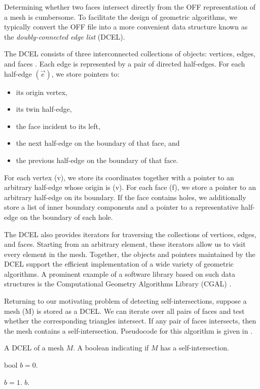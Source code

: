 Determining whether two faces intersect directly from the OFF representation of a mesh is cumbersome. To facilitate the design of geometric algorithms, we typically convert the OFF file into a more convenient data structure known as the \emph{doubly-connected edge list} (DCEL).

The DCEL consists of three interconnected collections of objects: vertices, edges, and faces \cite{dutchbook3}. Each edge is represented by a pair of directed half-edges. For each half-edge $(\overrightarrow{e})$, we store pointers to:

\begin{itemize}
\item its origin vertex,
\item its twin half-edge,
\item the face incident to its left,
\item the next half-edge on the boundary of that face, and
\item the previous half-edge on the boundary of that face.
\end{itemize}

For each vertex (v), we store its coordinates together with a pointer to an arbitrary half-edge whose origin is (v). For each face (f), we store a pointer to an arbitrary half-edge on its boundary. If the face contains holes, we additionally store a list of inner boundary components and a pointer to a representative half-edge on the boundary of each hole.

The DCEL also provides iterators for traversing the collections of vertices, edges, and faces. Starting from an arbitrary element, these iterators allow us to visit every element in the mesh. Together, the objects and pointers maintained by the DCEL support the efficient implementation of a wide variety of geometric algorithms. A prominent example of a software library based on such data structures is the Computational Geometry Algorithms Library (CGAL) \cite{cgal,cgal:eb-24b}.

Returning to our motivating problem of detecting self-intersections, suppose a mesh (M) is stored as a DCEL. We can iterate over all pairs of faces and test whether the corresponding triangles intersect. If any pair of faces intersects, then the mesh contains a self-intersection. Pseudocode for this algorithm is given in .


\begin{algorithm}
 \caption{Self-intersection}\label{alg:self-intersection}
    \begin{algorithmic}[1]
      \Require A DCEL of a mesh $M.$
        \Ensure A boolean indicating if $M$ has a self-intersection.
        
        \State bool $b=0.$
	
		\State $b=1.$
	\EndIf 
	\EndFor
\EndFor
\Return $b$.
\end{algorithmic}
\end{algorithm}



